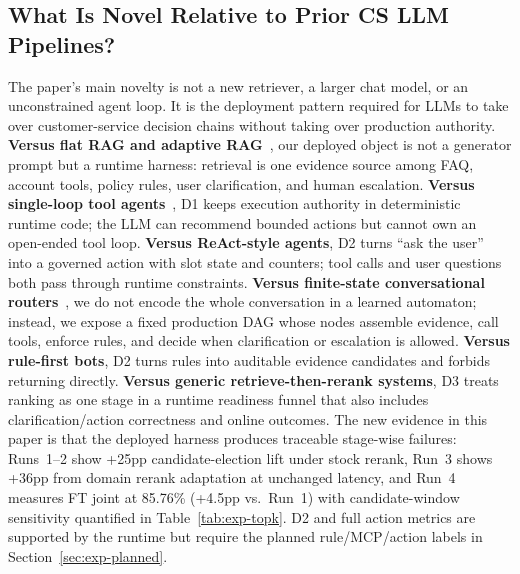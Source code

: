 \documentclass[sigconf,review]{acmart}
\newcommand{\code}[1]{\texttt{\seqsplit{#1}}}
\begin{document}
\subsection{What Is Novel Relative to Prior CS LLM Pipelines?}
\label{sec:discussion-novelty}
The paper's main novelty is not a new retriever, a larger chat model, or an unconstrained agent loop. It is the deployment pattern required for LLMs to take over customer-service decision chains without taking over production authority.
\textbf{Versus flat RAG and adaptive RAG}~\cite{lewis2020rag,asai2024selfrag,jeong2024adaptiverag,xu2024cskg}, our deployed object is not a generator prompt but a runtime harness: retrieval is one evidence source among FAQ, account tools, policy rules, user clarification, and human escalation.
\textbf{Versus single-loop tool agents}~\cite{yao2023react,singh2025agenticrag,qin2023toolllm}, D1 keeps execution authority in deterministic runtime code; the LLM can recommend bounded actions but cannot own an open-ended tool loop.
\textbf{Versus ReAct-style agents}, D2 turns ``ask the user'' into a governed action with slot state and counters; tool calls and user questions both pass through runtime constraints.
\textbf{Versus finite-state conversational routers}~\cite{sun2024dfarag}, we do not encode the whole conversation in a learned automaton; instead, we expose a fixed production DAG whose nodes assemble evidence, call tools, enforce rules, and decide when clarification or escalation is allowed.
\textbf{Versus rule-first bots}, D2 turns rules into auditable evidence candidates and forbids returning \code{rule\_answer} directly.
\textbf{Versus generic retrieve-then-rerank systems}, D3 treats ranking as one stage in a runtime readiness funnel that also includes clarification/action correctness and online outcomes.
The new evidence in this paper is that the deployed harness produces traceable stage-wise failures: Runs~1--2 show +25pp candidate-election lift under stock rerank, Run~3 shows +36pp from domain rerank adaptation at unchanged latency, and Run~4 measures FT joint at 85.76\% (+4.5pp vs.\ Run~1) with candidate-window sensitivity quantified in Table~\ref{tab:exp-topk}. D2 and full action metrics are supported by the runtime but require the planned rule/MCP/action labels in Section~\ref{sec:exp-planned}.
\end{document}
